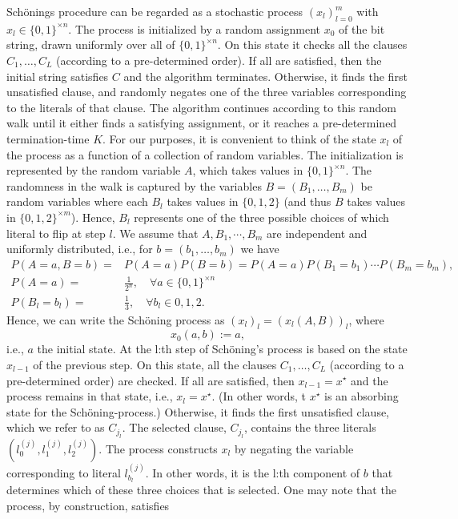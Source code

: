 \documentclass[a4paper,aps,floatfix]{revtex4}
\begin{document}
 Sch\"onings procedure can be regarded as a stochastic process $(x_l)_{l=0}^{m}$ with  $x_l \in\{0,1\}^{\times n}$. 
The process is initialized by a random assignment $x_0$ of the bit string, drawn uniformly over all of $\{0,1\}^{\times n}$. On this state it checks all the clauses $C_1,\ldots,C_L$ (according to a pre-determined order). If all are satisfied, then the initial string satisfies $C$ and the algorithm terminates. 
 Otherwise, it finds the first unsatisfied clause, and randomly negates one of the three variables corresponding to the literals of that clause. The algorithm continues according to this random walk until it either finds a satisfying assignment, or it reaches  a  pre-determined termination-time $K$.  For our purposes, it is convenient to think of the state $x_l$ of the process as a function of a collection of random variables. The initialization is represented by the random variable $A$, which takes values in $\{0,1\}^{\times n}$. The randomness in the walk is captured by the variables  $B = (B_1,\ldots, B_m)$ be random variables where each $B_l$ takes values in $\{0,1,2\}$ (and thus $B$ takes values in $\{0,1,2\}^{\times m}$). Hence, $B_l$ represents one of the three possible choices of which literal to flip at step $l$. 
   We assume that $A,B_1,\cdots, B_m$ are independent and uniformly distributed, i.e., for $b = (b_1,\ldots, b_m)$ we have
\begin{equation}
\label{dfabadfbadfn}
\begin{split}
P(A= a,B=b) = & P(A=a)P(B=b) = P(A = a)P(B_1 = b_1)\cdots P(B_m = b_m),\\
P(A = a) = & \frac{1}{2^n},\quad \forall a\in\{0,1\}^{\times n}\\
 P(B_l=b_l) = & \frac{1}{3},\quad \forall b_l\in{0,1,2}.
\end{split}
\end{equation}
Hence, we can write the Sch\"oning process as $(x_l)_{l} = (x_l(A,B))_{l}$, where
\begin{equation}
x_0(a,b) := a,
\end{equation}
i.e., $a$ the initial state. At the  l:th step of Sch\"oning's process is based on the state $x_{l-1}$ of the previous step. On this state, all the clauses $C_1,\ldots,C_L$ (according to a pre-determined order) are checked. If all are satisfied, then $x_{l-1} = x^{\star}$ and the process remains in that state, i.e., $x_l = x^{\star}$.
(In other words, t $x^{\star}$ is an absorbing state for the Sch\"oning-process.)
 Otherwise, it finds the first unsatisfied clause, which we refer to as $C_{j_l}$. The selected clause, $C_{j_l}$, contains the three literals $(l_0^{(j)},l_1^{(j)},l_2^{(j)})$. The process constructs $x_l$ by negating the variable corresponding to literal $l^{(j)}_{b_l}$. In other words, it is the l:th component of $b$ that determines which of these three choices that is selected. One may note that the process, by construction, satisfies
\end{document}
